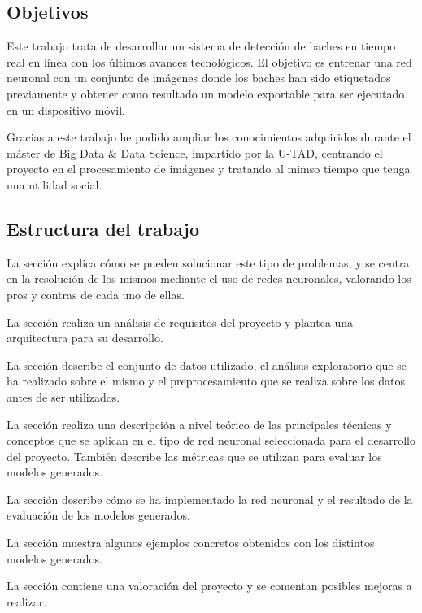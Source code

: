 \subsection{Objetivos}

Este trabajo trata de desarrollar un sistema de detección de baches en tiempo real en línea con los últimos avances tecnológicos. El objetivo es entrenar una red neuronal con un conjunto de imágenes donde los baches han sido etiquetados previamente y obtener como resultado un modelo exportable para ser ejecutado en un dispositivo móvil.

Gracias a este trabajo he podido ampliar los conocimientos adquiridos durante el máster de Big Data \& Data Science, impartido por la U-TAD, centrando el proyecto en el procesamiento de imágenes y tratando al mimso tiempo que tenga una utilidad social.

\subsection{Estructura del trabajo}

La sección \textit{} explica cómo se pueden solucionar este tipo de problemas, y se centra en la resolución de los mismos mediante el uso de redes neuronales, valorando los pros y contras de cada uno de ellas.

La sección \textit{} realiza un análisis de requisitos del proyecto y plantea una arquitectura para su desarrollo.

La sección \textit{} describe el conjunto de datos utilizado, el análisis exploratorio que se ha realizado sobre el mismo y el preprocesamiento que se realiza sobre los datos antes de ser utilizados.

La sección \textit{} realiza una descripción a nivel teórico de las principales técnicas y conceptos que se aplican en el tipo de red neuronal seleccionada para el desarrollo del proyecto. También describe las métricas que se utilizan para evaluar los modelos generados.

La sección \textit{} describe cómo se ha implementado la red neuronal y el resultado de la evaluación de los modelos generados.

La sección \textit{} muestra algunos ejemplos concretos obtenidos con los distintos modelos generados.

La sección \textit{} contiene una valoración del proyecto y se comentan posibles mejoras a realizar.

